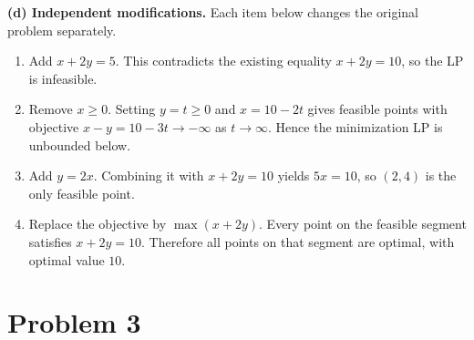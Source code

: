 \documentclass[11pt]{article}
\begin{document}
\textbf{(d) Independent modifications.}
Each item below changes the original problem separately.
\begin{enumerate}[label=(\roman*), leftmargin=*, itemsep=2pt]
  \item Add $x + 2y = 5$. This contradicts the existing equality $x + 2y = 10$, so the LP is infeasible.
  \item Remove $x \ge 0$. Setting $y = t \ge 0$ and $x = 10 - 2t$ gives feasible points with objective $x - y = 10 - 3t \to -\infty$ as $t \to \infty$. Hence the minimization LP is unbounded below.
  \item Add $y = 2x$. Combining it with $x + 2y = 10$ yields $5x = 10$, so $(2, 4)$ is the only feasible point.
  \item Replace the objective by $\max(x + 2y)$. Every point on the feasible segment satisfies $x + 2y = 10$. Therefore all points on that segment are optimal, with optimal value $10$.
\end{enumerate}

\newpage
\section*{Problem 3}
\end{document}
